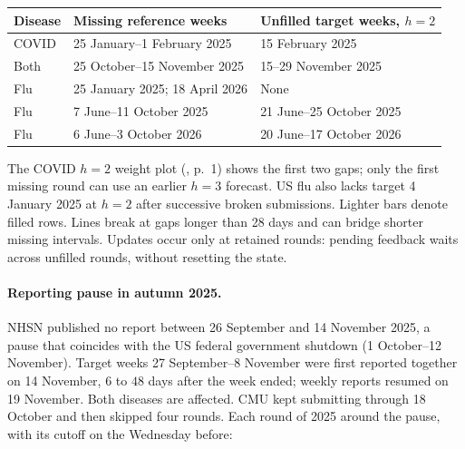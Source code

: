 \documentclass[11pt,a4paper]{article}
\theoremstyle{definition}
\theoremstyle{remark}
\begin{document}
\begin{center}\small
\begin{tabular}{@{}lll@{}}
\toprule
Disease & Missing reference weeks & Unfilled target weeks, $h=2$\\
\midrule
COVID & 25 January--1 February 2025 & 15 February 2025\\
Both & 25 October--15 November 2025 & 15--29 November 2025\\
Flu & 25 January 2025; 18 April 2026 & None\\
Flu & 7 June--11 October 2025 & 21 June--25 October 2025\\
Flu & 6 June--3 October 2026 & 20 June--17 October 2026\\
\bottomrule
\end{tabular}
\end{center}
The COVID $h=2$ weight plot
(, p.~1) shows the first
two gaps; only the first missing round can use an earlier $h=3$ forecast.
US flu also lacks target 4 January 2025 at $h=2$ after successive broken
submissions. Lighter bars denote filled rows. Lines break at gaps longer
than 28 days and can bridge shorter missing intervals.
Updates occur only at retained rounds: pending feedback waits across
unfilled rounds, without resetting the state.

\paragraph{Reporting pause in autumn 2025.}
\label{sec:reporting-pause}
NHSN published no report between 26 September and 14 November 2025, a
pause that coincides with the US federal government shutdown (1
October--12 November). Target weeks 27 September--8 November were first
reported together on 14 November, $6$ to $48$ days after the week ended;
weekly reports resumed on 19 November. Both diseases are affected. CMU
kept submitting through 18 October and then skipped four rounds. Each
round of 2025 around the pause, with its cutoff on the Wednesday before:
\end{document}
